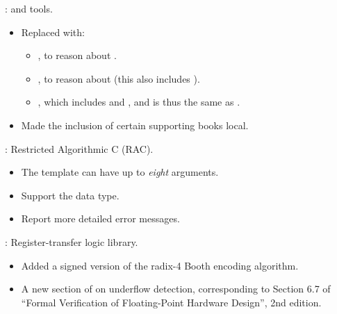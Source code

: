 \begin{frame}

\implibtitle

:
 and  tools.
\begin{itemize}
\item Replaced  with:
      \begin{itemize}
      \item {}, to reason about .
      \item {}, to reason about 
            (this also includes ).
      \item {},
            which includes  and ,
            and is thus the same as .
      \end{itemize}
\item Made the inclusion of certain supporting books local.
\end{itemize}

\end{frame}


\begin{frame}

\implibtitle

:
Restricted Algorithmic C (RAC).
\begin{itemize}
\item The  template can have up to {\em eight} arguments.
\item Support the  data type.
\item Report more detailed error messages.
\end{itemize}

\end{frame}


\begin{frame}

\implibtitle

:
Register-transfer logic library.
\begin{itemize}
\item Added a signed version of the radix-4 Booth encoding algorithm.
\item A new section of  on
      underflow detection, corresponding to Section 6.7 of ``Formal
      Verification of Floating-Point Hardware Design'', 2nd edition.
\end{itemize}

\end{frame}

